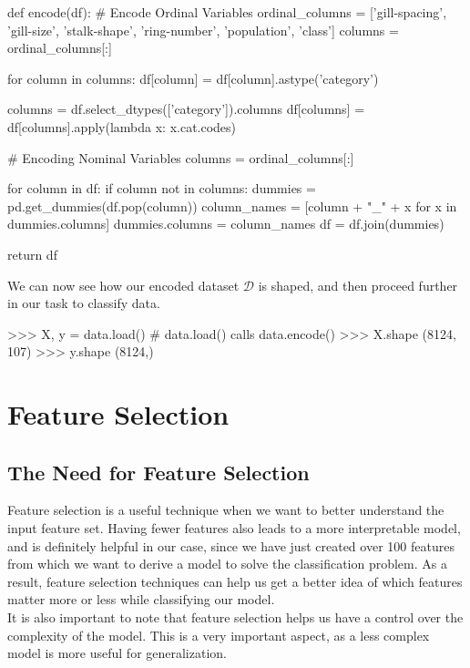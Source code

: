 \documentclass[fleqn]{article}
\begin{document}
    \begin{python}
def encode(df):
    # Encode Ordinal Variables
    ordinal_columns = ['gill-spacing', 'gill-size',
            'stalk-shape', 'ring-number', 'population', 'class']
    columns = ordinal_columns[:]

    for column in columns:
        df[column] = df[column].astype('category')

        columns = df.select_dtypes(['category']).columns
        df[columns] = df[columns].apply(lambda x: x.cat.codes)

    # Encoding Nominal Variables
    columns = ordinal_columns[:]

    for column in df:
        if column not in columns:
            dummies = pd.get_dummies(df.pop(column))
            column_names = [column + "_" + x for x in dummies.columns]
            dummies.columns = column_names
            df = df.join(dummies)

    return df
    \end{python}

    \noindent
    We can now see how our encoded dataset $ \mathcal{D} $ is shaped, and then proceed
    further in our task to classify data.

    \begin{python}
>>> X, y = data.load() # data.load() calls data.encode()
>>> X.shape
(8124, 107)
>>> y.shape
(8124,)
    \end{python}

    \section{Feature Selection}

    \subsection{The Need for Feature Selection}
    Feature selection is a useful technique when we want to better understand the input
    feature set. Having fewer features also leads to a more interpretable model, and is
    definitely helpful in our case, since we have just created over 100 features from
    which we want to derive a model to solve the classification problem. As a result,
    feature selection techniques can help us get a better idea of which features matter
    more or less while classifying our model.\\

    It is also important to note that feature selection helps us have a control over the
    complexity of the model. This is a very important aspect, as a less complex model
    is more useful for generalization.
\end{document}
